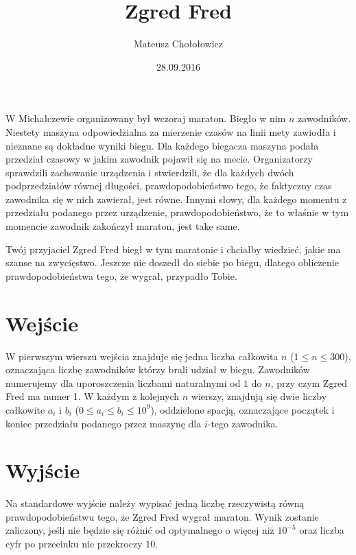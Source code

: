 \documentclass[zad,zawodnik,utf8]{sinol}
\title{Zgred Fred}
\author{Mateusz Chołołowicz} %
\date{28.09.2016}
\begin{document}
  \begin{tasktext}%

  
W Michałczewie organizowany był wczoraj maraton. Biegło w nim $n$ zawodników. Niestety maszyna odpowiedzialna za mierzenie czasów na linii mety
zawiodła i nieznane są dokładne wyniki biegu. Dla każdego biegacza maszyna podała przedział czasowy w jakim zawodnik pojawił się na mecie.
Organizatorzy sprawdzili zachowanie urządzenia i stwierdzili, że dla każdych dwóch podprzedziałów równej długości, prawdopodobieństwo
tego, że faktyczny czas zawodnika się w nich zawierał, jest równe. Innymi słowy, dla każdego momentu z przedziału podanego
przez urządzenie, prawdopodobieństwo, że to właśnie w tym momencie zawodnik zakończył maraton, jest take same.

Twój przyjaciel Zgred Fred biegł w tym maratonie i chciałby wiedzieć, jakie ma szanse na zwycięstwo. Jeszcze nie doszedł do siebie po biegu,
dlatego obliczenie prawdopodobieństwa tego, że wygrał, przypadło Tobie.

 \section{Wejście}
    
W pierwszym wierszu wejścia znajduje się jedna liczba całkowita $n$ ($1 \leq n \leq 300$), oznaczająca liczbę zawodników którzy brali udział w biegu.
Zawodników numerujemy dla uporoszczenia liczbami naturalnymi od $1$ do $n$, przy czym Zgred Fred ma numer 1.
W każdym z kolejnych $n$ wierszy, znajdują się dwie liczby całkowite $a_i$ i $b_i$ ($0 \leq a_i \leq b_i \leq 10^9$), 
oddzielone spacją, oznaczające początek i koniec przedziału podanego przez maszynę dla $i$-tego zawodnika.

  \section{Wyjście}
    Na standardowe wyjście należy wypisać jedną liczbę rzeczywistą równą prawdopodobieństwu tego, że Zgred Fred wygrał maraton. Wynik 
    zostanie zaliczony, jeśli nie będzie się różnić od optymalnego o więcej niż $10^{-5}$ oraz liczba cyfr po przecinku nie przekroczy $10$.
    
    \makecompactexample

  \end{tasktext}
\end{document}
